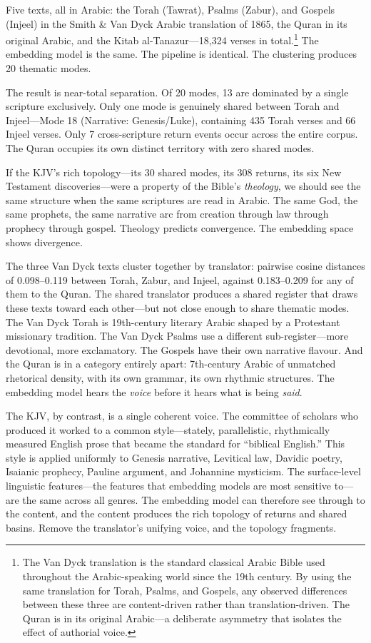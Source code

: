 Five texts, all in Arabic: the Torah (Tawrat), Psalms (Zabur), and Gospels (Injeel) in the Smith \& Van Dyck Arabic translation of 1865, the Quran in its original Arabic, and the Kitab al-Tanazur---18,324 verses in total.\footnote{The Van Dyck translation is the standard classical Arabic Bible used throughout the Arabic-speaking world since the 19th century. By using the same translation for Torah, Psalms, and Gospels, any observed differences between these three are content-driven rather than translation-driven. The Quran is in its original Arabic---a deliberate asymmetry that isolates the effect of authorial voice.} The embedding model is the same. The pipeline is identical. The clustering produces 20 thematic modes.

The result is near-total separation. Of 20 modes, 13 are dominated by a single scripture exclusively. Only one mode is genuinely shared between Torah and Injeel---Mode 18 (Narrative: Genesis/Luke), containing 435 Torah verses and 66 Injeel verses. Only 7 cross-scripture return events occur across the entire corpus. The Quran occupies its own distinct territory with zero shared modes.

If the KJV's rich topology---its 30 shared modes, its 308 returns, its six New Testament discoveries---were a property of the Bible's \emph{theology}, we should see the same structure when the same scriptures are read in Arabic. The same God, the same prophets, the same narrative arc from creation through law through prophecy through gospel. Theology predicts convergence. The embedding space shows divergence.

The three Van Dyck texts cluster together by translator: pairwise cosine distances of 0.098--0.119 between Torah, Zabur, and Injeel, against 0.183--0.209 for any of them to the Quran. The shared translator produces a shared register that draws these texts toward each other---but not close enough to share thematic modes. The Van Dyck Torah is 19th-century literary Arabic shaped by a Protestant missionary tradition. The Van Dyck Psalms use a different sub-register---more devotional, more exclamatory. The Gospels have their own narrative flavour. And the Quran is in a category entirely apart: 7th-century Arabic of unmatched rhetorical density, with its own grammar, its own rhythmic structures. The embedding model hears the \emph{voice} before it hears what is being \emph{said}.

The KJV, by contrast, is a single coherent voice. The committee of scholars who produced it worked to a common style---stately, parallelistic, rhythmically measured English prose that became the standard for ``biblical English.'' This style is applied uniformly to Genesis narrative, Levitical law, Davidic poetry, Isaianic prophecy, Pauline argument, and Johannine mysticism. The surface-level linguistic features---the features that embedding models are most sensitive to---are the same across all genres. The embedding model can therefore see through to the content, and the content produces the rich topology of returns and shared basins. Remove the translator's unifying voice, and the topology fragments.

